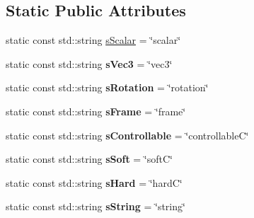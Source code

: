 \subsection*{Static Public Attributes}
\begin{DoxyCompactItemize}
\item 
static const std\-::string \hyperlink{classgiskard__suturo_1_1GiskardPPParser_a01e9ef7fa18417e28380b93b91c389b1}{s\-Scalar} = \char`\"{}scalar\char`\"{}
\item 
\hypertarget{classgiskard__suturo_1_1GiskardPPParser_a38ddaad3ec6be6e5c2eda92e5b6c9660}{static const std\-::string {\bfseries s\-Vec3} = \char`\"{}vec3\char`\"{}}\label{classgiskard__suturo_1_1GiskardPPParser_a38ddaad3ec6be6e5c2eda92e5b6c9660}

\item 
\hypertarget{classgiskard__suturo_1_1GiskardPPParser_a47b3fbf28535d3a20ae47260eb0814b0}{static const std\-::string {\bfseries s\-Rotation} = \char`\"{}rotation\char`\"{}}\label{classgiskard__suturo_1_1GiskardPPParser_a47b3fbf28535d3a20ae47260eb0814b0}

\item 
\hypertarget{classgiskard__suturo_1_1GiskardPPParser_acbe90b54e0d072aa38143ed191b17bd0}{static const std\-::string {\bfseries s\-Frame} = \char`\"{}frame\char`\"{}}\label{classgiskard__suturo_1_1GiskardPPParser_acbe90b54e0d072aa38143ed191b17bd0}

\item 
\hypertarget{classgiskard__suturo_1_1GiskardPPParser_ab9e6fa7b662128e5f67f7d59c0388893}{static const std\-::string {\bfseries s\-Controllable} = \char`\"{}controllable\-C\char`\"{}}\label{classgiskard__suturo_1_1GiskardPPParser_ab9e6fa7b662128e5f67f7d59c0388893}

\item 
\hypertarget{classgiskard__suturo_1_1GiskardPPParser_a6bda30a80e9ada00b36102d07b230052}{static const std\-::string {\bfseries s\-Soft} = \char`\"{}soft\-C\char`\"{}}\label{classgiskard__suturo_1_1GiskardPPParser_a6bda30a80e9ada00b36102d07b230052}

\item 
\hypertarget{classgiskard__suturo_1_1GiskardPPParser_a6b06fc54e7ebb1cf5b5ccae822eaf498}{static const std\-::string {\bfseries s\-Hard} = \char`\"{}hard\-C\char`\"{}}\label{classgiskard__suturo_1_1GiskardPPParser_a6b06fc54e7ebb1cf5b5ccae822eaf498}

\item 
\hypertarget{classgiskard__suturo_1_1GiskardPPParser_a747fe4deef996de2256cc1644e19d850}{static const std\-::string {\bfseries s\-String} = \char`\"{}string\char`\"{}}\label{classgiskard__suturo_1_1GiskardPPParser_a747fe4deef996de2256cc1644e19d850}


\end{DoxyCompactItemize}

